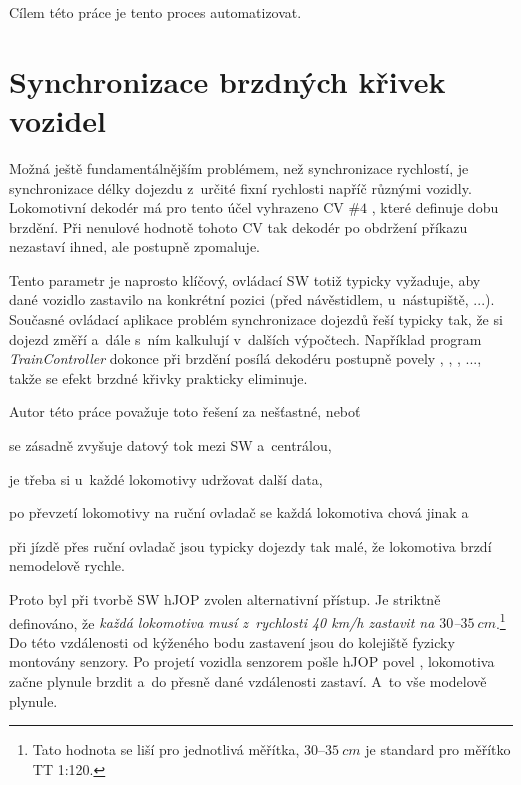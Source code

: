 Cílem této práce je tento proces automatizovat.

\section{Synchronizace brzdných křivek vozidel}
\label{sec:sync-krivky}

Možná ještě fundamentálnějším problémem, než synchronizace rychlostí, je
synchronizace délky dojezdu z~určité fixní rychlosti napříč různými vozidly.
Lokomotivní dekodér má pro tento účel vyhrazeno CV $\#4$ \cite{zimo:cvs}, které
definuje dobu brzdění. Při nenulové hodnotě tohoto CV tak dekodér po obdržení
příkazu  nezastaví ihned, ale postupně zpomaluje.

Tento parametr je naprosto klíčový, ovládací SW totiž typicky vyžaduje, aby dané
vozidlo zastavilo na konkrétní pozici (před návěstidlem, u~nástupiště, ...).
Současné ovládací aplikace problém synchronizace dojezdů řeší typicky tak, že si
dojezd změří a~dále s~ním kalkulují v~dalších výpočtech. Například program
\textit{TrainController} \cite{traincontroller:web} dokonce při brzdění
posílá dekodéru postupně povely , ,
, ..., takže se efekt brzdné křivky prakticky eliminuje.

Autor této práce považuje toto řešení za nešťastné, neboť
\begin{compactenum}
\item se zásadně zvyšuje datový tok mezi SW a~centrálou,
\item je třeba si u~každé lokomotivy udržovat další data,
\item po převzetí lokomotivy na ruční ovladač se každá lokomotiva chová jinak a
\item při jízdě přes ruční ovladač jsou typicky dojezdy tak malé, že lokomotiva
      brzdí nemodelově rychle.
\end{compactenum}

Proto byl při tvorbě SW hJOP zvolen alternativní přístup. Je striktně
definováno, že \textit{každá lokomotiva musí z~rychlosti 40 km/h zastavit na
$30$--$35\ cm$}.\footnote{Tato hodnota se liší pro jednotlivá měřítka,
$30$--$35\ cm$ je standard pro měřítko TT 1:120.} Do této vzdálenosti od
kýženého bodu zastavení jsou do kolejiště fyzicky montovány senzory. Po
projetí vozidla senzorem pošle hJOP povel ,
lokomotiva začne plynule brzdit a~do přesně dané vzdálenosti zastaví. A~to vše
modelově plynule.

